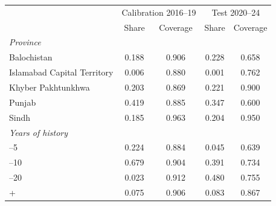\begin{tabular}{lcccc}
\toprule
 & \multicolumn{2}{c}{Calibration 2016--19} & \multicolumn{2}{c}{Test 2020--24} \\
 & Share & Coverage & Share & Coverage \\
\midrule
\emph{Province} \\
\quad Balochistan & 0.188 & 0.906 & 0.228 & 0.658 \\
\quad Islamabad Capital Territory & 0.006 & 0.880 & 0.001 & 0.762 \\
\quad Khyber Pakhtunkhwa & 0.203 & 0.869 & 0.221 & 0.900 \\
\quad Punjab & 0.419 & 0.885 & 0.347 & 0.600 \\
\quad Sindh & 0.185 & 0.963 & 0.204 & 0.950 \\
\emph{Years of history} \\
\quad 3--5 & 0.224 & 0.884 & 0.045 & 0.639 \\
\quad 6--10 & 0.679 & 0.904 & 0.391 & 0.734 \\
\quad 11--20 & 0.023 & 0.912 & 0.480 & 0.755 \\
\quad 21+ & 0.075 & 0.906 & 0.083 & 0.867 \\
\bottomrule
\end{tabular}
